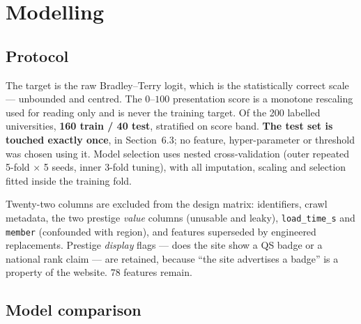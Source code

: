 \documentclass[11pt,a4paper]{article}
\begin{document}
\section{Modelling}

\subsection{Protocol}

The target is the raw Bradley--Terry logit, which is the statistically correct scale ---
unbounded and centred. The $0$--$100$ presentation score is a monotone rescaling used for
reading only and is never the training target. Of the 200 labelled universities,
\textbf{160 train / 40 test}, stratified on score band. \textbf{The test set is touched
exactly once}, in Section~6.3; no feature, hyper-parameter or threshold was chosen using it.
Model selection uses nested cross-validation (outer repeated 5-fold $\times$ 5 seeds, inner
3-fold tuning), with all imputation, scaling and selection fitted inside the training fold.

Twenty-two columns are excluded from the design matrix: identifiers, crawl metadata, the two
prestige \emph{value} columns (unusable and leaky), \texttt{load\_time\_s} and \texttt{member}
(confounded with region), and features superseded by engineered replacements. Prestige
\emph{display} flags --- does the site show a QS badge or a national rank claim --- are
retained, because ``the site advertises a badge'' is a property of the website. 78 features
remain.

\subsection{Model comparison}
\end{document}
